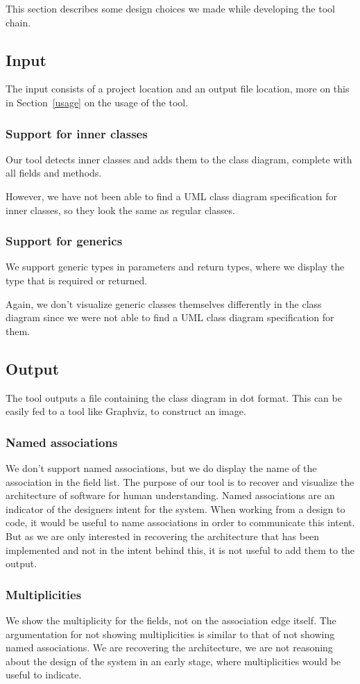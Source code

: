 This section describes some design choices we made while developing the tool chain.

\subsection{Input}
	The input consists of a project location and an output file location, more on this in Section~\ref{usage} on the usage of the tool.

	\subsubsection{Support for inner classes}
		Our tool detects inner classes and adds them to the class diagram, complete with all fields and methods.
		
		However, we have not been able to find a UML class diagram specification for inner classes, so they look the same as regular classes.
	\subsubsection{Support for generics}
		We support generic types in parameters and return types, where we display the type that is required or returned.
		
		Again, we don't visualize generic classes themselves differently in the class diagram since we were not able to find a UML class diagram specification for them.

\subsection{Output}
	The tool outputs a file containing the class diagram in dot format. 
	This can be easily fed to a tool like Graphviz, to construct an image.

	\subsubsection{Named associations}
		We don't support named associations, but we do display the name of the association in the field list. 
		The purpose of our tool is to recover and visualize the architecture of software for human understanding.
		Named associations are an indicator of the designers intent for the system.
		When working from a design to code, it would be useful to name associations in order to communicate this intent.
		But as we are only interested in recovering the architecture that has been implemented and not in the intent behind this,
		it is not useful to add them to the output.
		
	\subsubsection{Multiplicities}
		We show the multiplicity for the fields, not on the association edge itself. 
		The argumentation for not showing multiplicities is similar to that of not showing named associations.
		We are recovering the architecture, we are not reasoning about the design of the system in an early stage, 
		where multiplicities would be useful to indicate.
